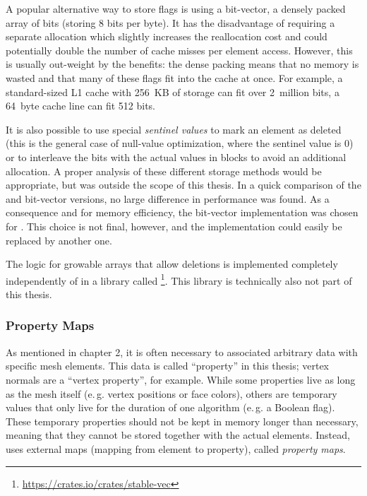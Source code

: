A popular alternative way to store  flags is using a bit-vector, a densely packed array of bits (storing 8 bits per byte).
It has the disadvantage of requiring a separate allocation which slightly increases the reallocation cost and could potentially double the number of cache misses per element access.
However, this is usually out-weight by the benefits:
the dense packing means that no memory is wasted and that many of these flags fit into the cache at once.
For example, a standard-sized L1 cache with 256~KB of storage can fit over 2~million bits, a 64~byte cache line can fit 512 bits.

It is also possible to use special \emph{sentinel values} to mark an element as deleted (this is the general case of null-value optimization, where the sentinel value is 0) or to interleave the bits with the actual values in blocks to avoid an additional allocation.
A proper analysis of these different storage methods would be appropriate, but was outside the scope of this thesis.
In a quick comparison of the  and bit-vector versions, no large difference in performance was found.
As a consequence and for memory efficiency, the bit-vector implementation was chosen for .
This choice is not final, however, and the implementation could easily be replaced by another one.

The logic for growable arrays that allow deletions is implemented completely independently of  in a library called \footnote{\url{https://crates.io/crates/stable-vec}}.
This library is technically also not part of this thesis.





\newpage
\subsubsection*{Property Maps}

As mentioned in chapter 2, it is often necessary to associated arbitrary data with specific mesh elements.
This data is called \enquote{property} in this thesis; vertex normals are a \enquote{vertex property}, for example.
While some properties live as long as the mesh itself (e.\,g. vertex positions or face colors),  others are temporary values that only live for the duration of one algorithm (e.\,g. a Boolean  flag).
These temporary properties should not be kept in memory longer than necessary, meaning that they cannot be stored together with the actual elements.
Instead,  uses external maps (mapping from element to property), called \emph{property maps}.

